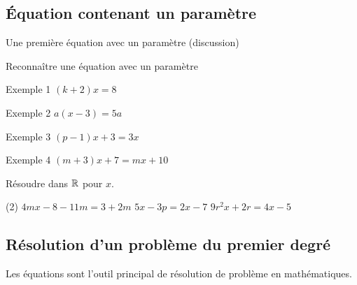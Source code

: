 \documentclass[a4paper,12pt]{article}
\begin{document}
\subsection{Équation contenant un paramètre}
\begin{exemple}
	Une première équation avec un paramètre (discussion)
	\tcblower
	\vspace{8cm}

\end{exemple}


\begin{exemple}
	Reconnaître une équation avec un paramètre
	\tcblower
	\vspace{6cm}

\end{exemple}

\begin{exemple}
	Exemple 1 $(k+2)x=8$
	\tcblower
	\vspace{6cm}

\end{exemple}


\begin{exemple}
	Exemple 2 $a(x-3)=5a$
	\tcblower
	\vspace{6cm}

\end{exemple}

\begin{exemple}
	Exemple 3 $(p-1)x+3=3x$ 
	\tcblower
	\vspace{6cm}

\end{exemple}

\begin{exemple}
	Exemple 4 $(m+3)x+7=mx+10$
	\tcblower
	\vspace{6cm}

\end{exemple}
\begin{exercice}
	\tcblower
Résoudre dans $\mathbb{R}$ pour $x$.
\begin{tasks}(2)
	\task $4 m x-8-11 m=3+2 m$
	\task $5x-3p=2x-7$
	\task $9r^2x+2r=4x-5$
\end{tasks}
\end{exercice}

\newpage
\subsection{Résolution d'un problème du premier degré}
Les équations sont l'outil principal de résolution de problème en mathématiques. 
\end{document}
